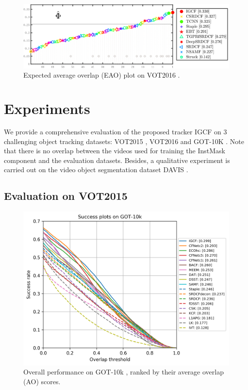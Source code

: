 \documentclass[review]{elsarticle}
\begin{document}
\begin{CJK*}{UTF8}{gbsn}
\begin{figure}
    \centering
    \includegraphics[width=12cm]{images/vot/eao_rank_vot2016.png}
    \caption{Expected average overlap (EAO) plot on VOT2016 \cite{Kristan2016TheVO}.}
    \label{fig:vot16}
\end{figure}

\section{Experiments}
We provide a comprehensive evaluation of the proposed tracker IGCF on 3 challenging object tracking datasets: VOT2015 \cite{Kristan2015TheVO}, VOT2016 \cite{Kristan2016TheVO} and GOT-10K \cite{Huang2018GOT10kAL}. Note that there is no overlap between the videos used for training the InstMask component and the evaluation datasets. Besides, a qualitative experiment is carried out on the video object segmentation dataset DAVIS \cite{Perazzi2016}.
\subsection{Evaluation on VOT2015}

\begin{figure}
    \centering
    \includegraphics[width=12cm]{images/got10k/success_plot.png}
    \caption{Overall performance on GOT-10k \cite{Huang2018GOT10kAL}, ranked by their average overlap (AO) scores.}
    \label{fig:got10k}
\end{figure}


\end{CJK*}
\end{document}
